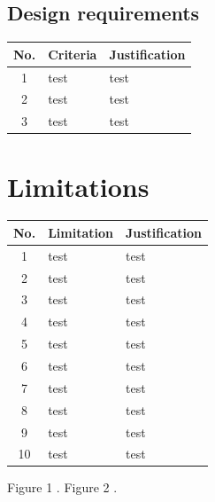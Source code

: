 \documentclass[11pt,a4paper]{report}
\begin{document}
\subsection{Design requirements}
\begin{center}
\begin{tabular}{ | c | m{18em} | m{18em} | }
\hline
 \textbf{No.} & \textbf{Criteria} & \textbf{Justification} \\
\hline
1 & test & test \\
\hline
2 & test & test \\
\hline
3 & test & test \\
\hline
\end{tabular}
\end{center}


\section{Limitations}

\begin{center}
\begin{tabular}{ | c | m{18em} | m{18em} | }
\hline
 \textbf{No.} & \textbf{Limitation} & \textbf{Justification} \\
\hline
1 & test & test \\
\hline
2 & test & test \\
\hline
3 & test & test \\
\hline
4 & test & test \\
\hline
5 & test & test \\
\hline
6 & test & test \\
\hline
7 & test & test \\
\hline
8 & test & test \\
\hline
9 & test & test \\
\hline
10 & test & test \\
\hline
\end{tabular}
\end{center}






Figure 1 \cite{Gratzer2007}.
Figure 2 \cite{Gratzer2008}.

\newpage


\end{document}
